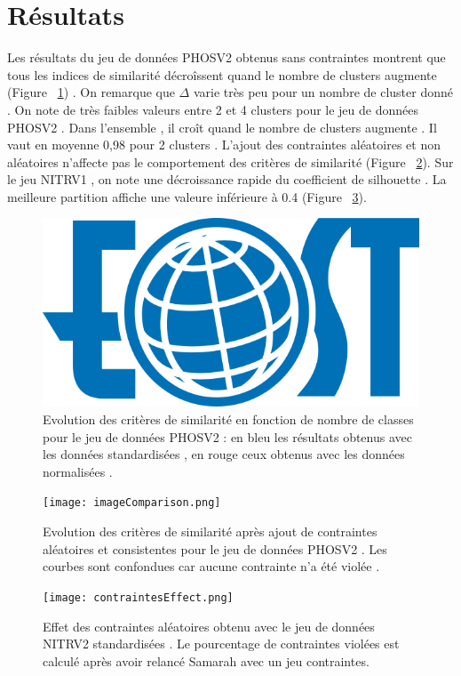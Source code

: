 \documentclass[11pt, openany]{report}
\begin{document}
\section{Résultats}
Les résultats  du jeu de données PHOSV2 obtenus sans contraintes montrent que tous les indices de similarité décroîssent quand le nombre de clusters augmente (Figure ~\ref{fig:criteriaEvolution}) .
On remarque que $\Delta$ varie très peu pour un nombre de cluster donné . On note de très faibles valeurs entre 2 et 4 clusters pour le jeu de données PHOSV2 . Dans l'ensemble , il croît  quand le nombre de clusters augmente . Il vaut en moyenne  0,98 pour 2  clusters . L'ajout des contraintes aléatoires et non aléatoires n'affecte pas le comportement des critères de similarité  (Figure ~\ref{fig:phosvNoEvolution}).
Sur le jeu NITRV1 , on note une décroissance rapide du coefficient de silhouette . La meilleure partition affiche une valeure inférieure à 0.4 (Figure ~\ref{fig:nitrvEvolution}).


\begin{figure}[H]
  \centering
  \includegraphics[width=0.6\linewidth]{eost.png}
  \caption{Evolution des critères de similarité en fonction de nombre de classes pour le jeu de données PHOSV2 : en bleu les résultats obtenus avec les données standardisées , en rouge ceux obtenus avec les données normalisées .}
  \label{fig:criteriaEvolution}
\end{figure}

\begin{figure}[H]
  \centering
  \texttt{[image: imageComparison.png]}
  \caption{Evolution des critères de similarité après ajout de contraintes aléatoires et consistentes pour  le jeu de données PHOSV2 . Les courbes sont confondues car aucune contrainte n'a été violée .}
  \label{fig:phosvNoEvolution}
\end{figure}

\begin{figure}[H]
  \centering
  \texttt{[image: contraintesEffect.png]}
  \caption{Effet des contraintes aléatoires obtenu avec le jeu de données NITRV2 standardisées . Le pourcentage  de contraintes violées  est calculé après avoir relancé Samarah avec un jeu contraintes. }
  \label{fig:nitrvEvolution}
\end{figure}
\end{document}
